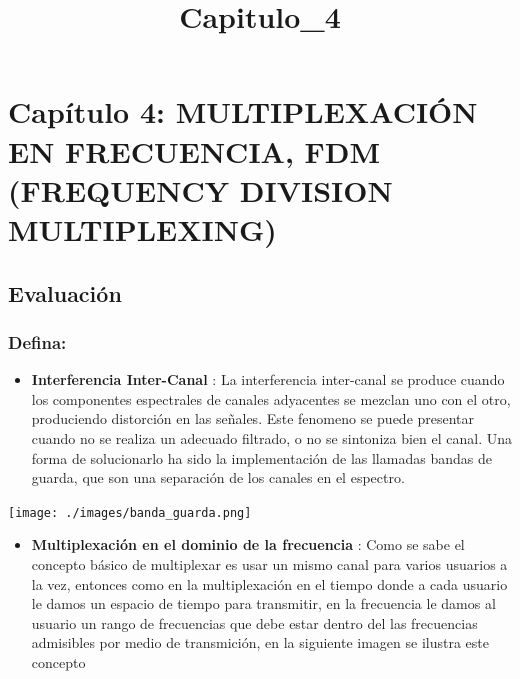 \documentclass[11pt]{article}
\title{Capitulo\_4}
\providecommand{\tightlist}{%
      \setlength{\itemsep}{0pt}\setlength{\parskip}{0pt}}
\begin{document}
    
    \maketitle
    
    

    
    \hypertarget{capuxedtulo-4-multiplexaciuxf3n-en-frecuencia-fdm-frequency-division-multiplexing}{%
\section{Capítulo 4: MULTIPLEXACIÓN EN FRECUENCIA, FDM (FREQUENCY
DIVISION
MULTIPLEXING)}\label{capuxedtulo-4-multiplexaciuxf3n-en-frecuencia-fdm-frequency-division-multiplexing}}

    \hypertarget{evaluaciuxf3n}{%
\subsection{Evaluación}\label{evaluaciuxf3n}}

\hypertarget{defina}{%
\subsubsection{Defina:}\label{defina}}

\begin{itemize}
\tightlist
\item
  \textbf{Interferencia Inter-Canal} : La interferencia inter-canal se
  produce cuando los componentes espectrales de canales adyacentes se
  mezclan uno con el otro, produciendo distorción en las señales. Este
  fenomeno se puede presentar cuando no se realiza un adecuado filtrado,
  o no se sintoniza bien el canal. Una forma de solucionarlo ha sido la
  implementación de las llamadas bandas de guarda, que son una
  separación de los canales en el espectro.
\end{itemize}

\texttt{[image: ./images/banda\_guarda.png]}

\begin{itemize}
\tightlist
\item
  \textbf{Multiplexación en el dominio de la frecuencia} : Como se sabe
  el concepto básico de multiplexar es usar un mismo canal para varios
  usuarios a la vez, entonces como en la multiplexación en el tiempo
  donde a cada usuario le damos un espacio de tiempo para transmitir, en
  la frecuencia le damos al usuario un rango de frecuencias que debe
  estar dentro del las frecuencias admisibles por medio de transmición,
  en la siguiente imagen se ilustra este concepto
\end{itemize}
\end{document}
